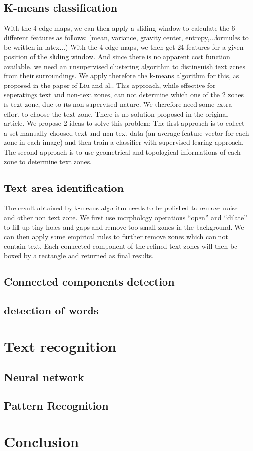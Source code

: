 \documentclass[paper=a4, french, 11pt]{scrartcl}
\begin{document}
\subsection{K-means classification}
With the 4 edge maps, we can then apply a sliding window to calculate the 6 different features as follows:
(mean, variance, gravity center, entropy,...formules to be written in latex...)
With the 4 edge maps, we then get 24 features for a given position of the sliding window. And since there is no apparent cost function available, we need an unsupervised clustering algorithm to distinguish text zones from their surroundings. We apply therefore the k-means algorithm for this, as proposed in the paper of Liu and al..
This approach, while effective for seperatings text and non-text zones, can not determine which one of the 2 zones is text zone, due to its non-supervised nature. We therefore need some extra effort to choose the text zone. There is no solution proposed in the original article. We propose 2 ideas to solve this problem: The first approach is to collect a set manually choosed text and non-text data (an average feature vector for each zone in each image) and then train a classifier with supervised learing approach. The second approach is to use geometrical and topological informations of each zone to determine text zones.
\subsection{Text area identification}
 The result obtained by k-means algoritm needs to be polished to remove noise and other non text zone. We first use morphology operations “open” and “dilate” to fill up tiny holes and gaps and remove too small zones in the background. We can then apply some empirical rules to further remove zones which can not contain text. Each connected component of the refined text zones will then be boxed by a rectangle and returned as final results.
\subsection{Connected components detection}
\subsection{detection of words}

\section{Text recognition}
\subsection{Neural network}
\subsection{Pattern Recognition}

\section{Conclusion}
\end{document}
